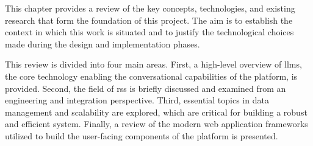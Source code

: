 This chapter provides a review of the key concepts, technologies, and existing research that form the foundation of this project. The aim is to establish the context in which this work is situated and to justify the technological choices made during the design and implementation phases.

This review is divided into four main areas. First, a high-level overview of \acp{llm}, the core technology enabling the conversational capabilities of the platform, is provided. Second, the field of \aclp{rs} is briefly discussed and examined from an engineering and integration perspective. Third, essential topics in data management and scalability are explored, which are critical for building a robust and efficient system. Finally, a review of the modern web application frameworks utilized to build the user-facing components of the platform is presented.